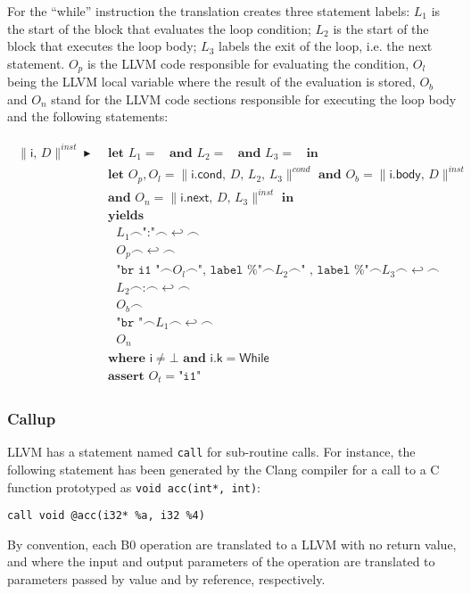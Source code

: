 \documentclass{article}
\newcommand{\trad}[2]{\ensuremath{\lVert \textsf{#1} \rVert^{\textit{#2}}}}
\newcommand{\nl}[0]{\ensuremath{\hookleftarrow}}
\DeclareMathOperator{\conc}{\smallfrown}
\DeclareMathOperator{\isdef}{\blacktriangleright}
\DeclareMathOperator{\name}{\mathcal{L}()}
\begin{document}
For the ``while'' instruction the translation creates three statement
labels: $L_1$ is the start of the block that evaluates the loop condition;
$L_2$ is the start of the block that executes the loop body; $L_3$ labels
the exit of the loop, i.e. the next statement. $O_p$ is the
LLVM code responsible for evaluating the condition, $O_l$ being the
LLVM local variable where the result of the evaluation is stored,
$O_b$ and $O_n$ stand for the LLVM code sections responsible for
executing the loop body and the following statements:

\begin{framed}
\begin{align}
\begin{split}
  \trad{i, $D$}{inst} \isdef 
  & \textbf{ let } L_1 = \name \textbf{ and } L_2 = \name \textbf{ and } L_3 = \name \textbf{ in} \\
  & \textbf{ let } O_p, O_l = \trad{i.cond, $D$, $L_2$, $L_3$}{cond} \textbf{ and } O_b = \trad{i.body, $D$}{inst}  \\
  & \textbf{ and } O_n = \trad{i.next, $D$, $L_3$}{inst} \textbf{ in} \\
  & \textbf{ yields }  \\
  & \quad L_1 \conc \texttt{":"} \conc \nl \conc  \\
  & \quad O_p \conc \nl \conc  \\
  & \quad \texttt{"br i1 "} \conc O_l \conc \texttt{", label \%"} \conc L_2 \conc \texttt{" , label \%"} \conc L_3 \conc \nl \conc  \\
  & \quad L_2 \conc \texttt{:} \conc \nl \conc  \\
  & \quad O_b \conc  \\
  & \quad \texttt{"br "} \conc L_1 \conc \nl \conc  \\
  & \quad O_n  \\
  & \textbf{ where } \textsf{i} \ne \bot \textbf{ and } \textsf{i.k} = \textsf{While}  \\
  & \textbf{ assert } O_t = \texttt{"i1"} 
\end{split}
\end{align}
\end{framed}

\subsubsection{Callup} 

LLVM has a statement named \texttt{call} for sub-routine calls. For
instance, the following statement has been generated by the Clang
compiler for a call to a C function prototyped as
\verb^void acc(int*, int)^:
\begin{verbatim}
call void @acc(i32* %a, i32 %4)
\end{verbatim}
By convention, each B0 operation are translated to a LLVM with no
return value, and where the input and output parameters of the
operation are translated to parameters passed by value and by
reference, respectively.
\end{document}
